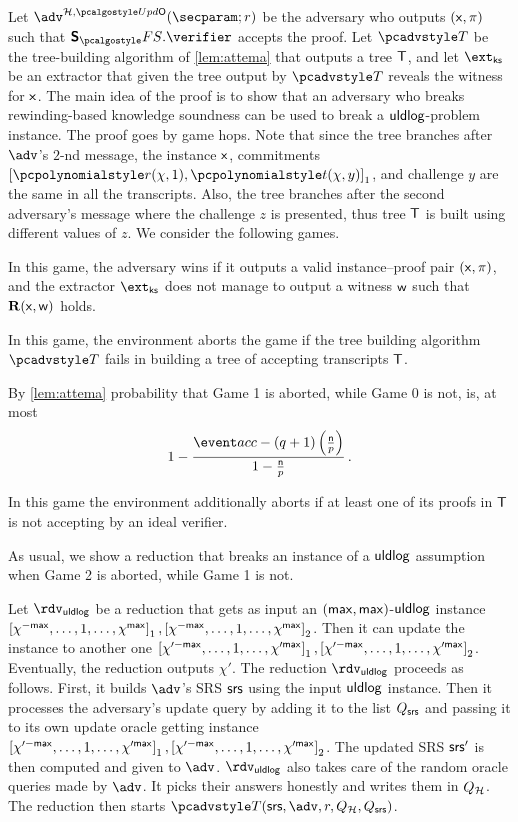 Let $\adv^{\ro, \initU}(\secparam; r)$ be the adversary who outputs $(\mathsf{x}, \pi)$ such that $\sonicprotfs.\verifier$ accepts the proof. Let $\tdv$ be the tree-building algorithm of \cref{lem:attema} that outputs a tree $\mathsf{T}$, and let $\extcss$ be an extractor that given the tree output by $\tdv$ reveals the witness for $\mathsf{x}$. The main idea of the proof is to show that an adversary who breaks rewinding-based knowledge soundness can be used to break a $\mathsf{uldlog}$-problem instance. The proof goes by game hops. Note that since the tree branches after $\adv$'s $2$-nd message, the instance $\mathsf{x}$, commitments $\gone{\p{r} (\chi, 1), \p{t} (\chi, y)}$, and challenge $y$ are the same in all the transcripts. Also, the tree branches after the second adversary's message where the challenge $z$ is presented, thus tree $\mathsf{T}$ is built using different values of $z$.	We consider the following games.

  In this game, the adversary wins if it outputs a valid instance--proof pair $(\mathsf{x}, \pi)$, and the extractor $\extcss$ does not manage to output a witness $\mathsf{w}$ such that $\mathbf{R} (\mathsf{x}, \mathsf{w})$ holds.

  In this game, the environment aborts the game if the tree building algorithm $\tdv$ fails in building a tree of accepting transcripts $\mathsf{T}$. 

  By \cref{lem:attema} probability that Game 1 is aborted, while Game 0 is not, is, at most
  \[
    1 - \frac{\accProb - (q + 1) \left( \frac{\noofc}{p} \right)} {1 - \frac{\noofc }{p}} \,.
\]

  In this game the environment additionally aborts if at least one of its proofs in $\mathsf{T}$ is not accepting by an ideal verifier.

  As usual, we show a reduction that breaks an instance of a $\mathsf{uldlog}$ assumption when Game 2 is aborted, while Game 1 is not.

  Let $\rdvuldlog$ be a reduction that gets as input an $(\mathsf{max}, \mathsf{max})$-$\mathsf{uldlog}$ instance $\left[\chi^{-\mathsf{max}}, \ldots, 1, \ldots, \chi^{\mathsf{max}}\right]_{1}, \left[\chi^{-\mathsf{max}}, \ldots, 1, \ldots, \chi^{\mathsf{max}}\right]_{2}$. Then it can update the instance to another one $\left[\chi'^{-\mathsf{max}}, \ldots, 1, \ldots, \chi'^{\mathsf{max}}\right]_{1}, \left[\chi'^{-\mathsf{max}}, \ldots, 1, \ldots, \chi'^{\mathsf{max}}\right]_{2}$. Eventually, the reduction outputs $\chi'$.
	The reduction $\rdvuldlog$ proceeds as follows.
	First, it builds $\adv$'s SRS $\mathsf{srs}$ using the input $\mathsf{uldlog}$ instance. Then it processes the adversary's update query by adding it to the list $Q_{\mathsf{srs}}$ and passing it to its own update oracle getting instance $\left[\chi'^{-\mathsf{max}}, \ldots, 1, \ldots, \chi'^{\mathsf{max}}\right]_{1}, \left[\chi'^{-\mathsf{max}}, \ldots, 1, \ldots, \chi'^{\mathsf{max}}\right]_{2}$. The updated SRS $\mathsf{srs}'$ is then computed and given to $\adv$. $\rdvuldlog$ also takes care of the random oracle queries made by $\adv$. It picks their answers honestly and writes them in $Q_{\mathcal{H}}$. The reduction then starts $\tdv(\srs, \adv, r, \Qro, \Qsrs)$.
	
